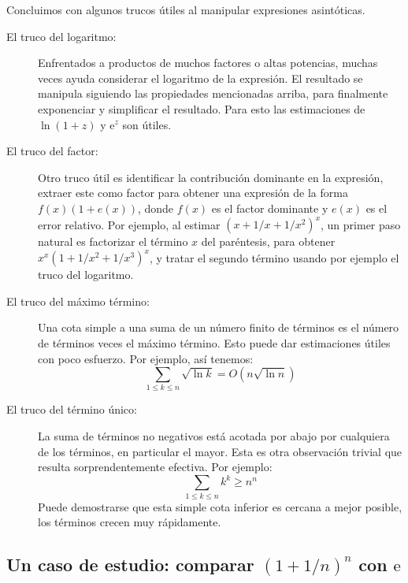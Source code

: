  Concluimos con algunos trucos útiles al manipular expresiones asintóticas.
  \begin{description}
  \item[El truco del logaritmo:]
    Enfrentados a productos de muchos factores o altas potencias,
    muchas veces ayuda considerar el logaritmo de la expresión.
    El resultado se manipula siguiendo las propiedades mencionadas arriba,
    para finalmente exponenciar y simplificar el resultado.
    Para esto las estimaciones de \(\ln (1 + z)\) y \(\mathrm{e}^z\)
    son útiles.
  \item[El truco del factor:]
    Otro truco útil es identificar la contribución dominante en la expresión,
    extraer este como factor
    para obtener una expresión de la forma \(f(x) (1 + e(x))\),
    donde \(f(x)\) es el factor dominante y \(e(x)\) es el error relativo.
    Por ejemplo,
    al estimar \((x + 1/x + 1/x^2)^x\),
    un primer paso natural es factorizar el término \(x\) del paréntesis,
    para obtener \(x^x (1 + 1/x^2 + 1/x^3)^x\),
    y tratar el segundo término usando por ejemplo el truco del logaritmo.
  \item[El truco del máximo término:]
    Una cota simple a una suma de un número finito de términos
    es el número de términos veces el máximo término.
    Esto puede dar estimaciones útiles con poco esfuerzo.
    Por ejemplo,
    así tenemos:
    \begin{equation*}
      \sum_{1 \le k \le n} \sqrt{\ln k}
        = O(n \sqrt{\ln n})
    \end{equation*}
  \item[El truco del término único:]
    La suma de términos no negativos está acotada por abajo
    por cualquiera de los términos,
    en particular el mayor.
    Esta es otra observación trivial que resulta sorprendentemente efectiva.
    Por ejemplo:
    \begin{equation*}
      \sum_{1 \le k \le n} k^k
        \ge n^n
    \end{equation*}
    Puede demostrarse que esta simple cota inferior es cercana a mejor posible,
    los términos crecen muy rápidamente.
  \end{description}

\subsection[Un caso de estudio:
            convergencia a \boldmath\(\mathrm{e}\)\unboldmath]
           {Un caso de estudio:
                comparar \boldmath\((1 + 1/n)^n\)
                con \(\mathrm{e}\)\unboldmath}
\label{sec:case-study-e}

